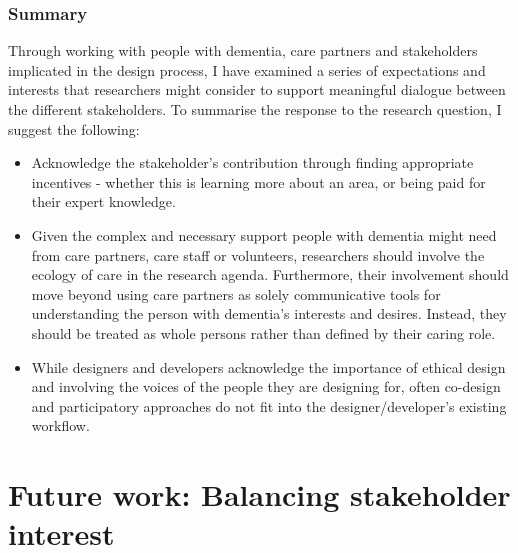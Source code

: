 \subsubsection{Summary}
\label{RQ3-summary}
Through working with people with dementia, care partners and stakeholders implicated in the design process, I have examined a series of expectations and interests that researchers might consider to support meaningful dialogue between the different stakeholders. To summarise the response to the research question, I  suggest the following:
\begin{itemize}
    \item Acknowledge the stakeholder's contribution through finding appropriate incentives - whether this is learning more about an area, or being paid for their expert knowledge.
    \item Given the complex and necessary support people with dementia might need from care partners, care staff or volunteers, researchers should involve the ecology of care in the research agenda. Furthermore, their involvement should move beyond using care partners as solely communicative tools for understanding the person with dementia's interests and desires. Instead, they should be treated as whole persons rather than defined by their caring role.
    \item While designers and developers acknowledge the importance of ethical design and involving the voices of the people they are designing for, often co-design and participatory approaches do not fit into the designer/developer's existing workflow.

\end{itemize}




\section{Future work: Balancing stakeholder interest}
\label{Discussion:Design}

